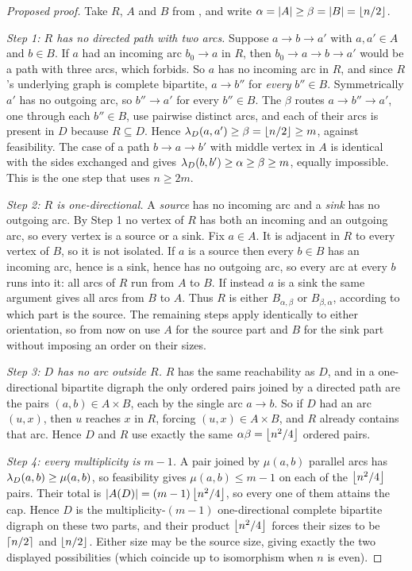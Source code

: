 \begin{proof}[Proposed proof]
Take $R$, $A$ and $B$ from , and write $\alpha = |A| \ge \beta = |B| = \left\lfloor n/2 \right\rfloor$.

\emph{Step 1: $R$ has no directed path with two arcs.} Suppose $a \to b \to a'$ with $a, a' \in A$ and $b \in B$. If $a$ had an incoming arc $b_0 \to a$ in $R$, then $b_0 \to a \to b \to a'$ would be a path with three arcs, which  forbids. So $a$ has no incoming arc in $R$, and since $R$'s underlying graph is complete bipartite, $a \to b''$ for \emph{every} $b'' \in B$. Symmetrically $a'$ has no outgoing arc, so $b'' \to a'$ for every $b'' \in B$. The $\beta$ routes $a \to b'' \to a'$, one through each $b'' \in B$, use pairwise distinct arcs, and each of their arcs is present in $D$ because $R \subseteq D$. Hence $\lambda_D(a,a') \ge \beta = \left\lfloor n/2 \right\rfloor \ge m$, against feasibility. The case of a path $b \to a \to b'$ with middle vertex in $A$ is identical with the sides exchanged and gives $\lambda_D(b,b') \ge \alpha \ge \beta \ge m$, equally impossible. This is the one step that uses $n \ge 2m$.

\emph{Step 2: $R$ is one-directional.} A \emph{source} has no incoming arc and a \emph{sink} has no outgoing arc. By Step 1 no vertex of $R$ has both an incoming and an outgoing arc, so every vertex is a source or a sink. Fix $a \in A$. It is adjacent in $R$ to every vertex of $B$, so it is not isolated. If $a$ is a source then every $b \in B$ has an incoming arc, hence is a sink, hence has no outgoing arc, so every arc at every $b$ runs into it: all arcs of $R$ run from $A$ to $B$. If instead $a$ is a sink the same argument gives all arcs from $B$ to $A$. Thus $R$ is either $B_{\alpha,\beta}$ or $B_{\beta,\alpha}$, according to which part is the source. The remaining steps apply identically to either orientation, so from now on use $A$ for the source part and $B$ for the sink part without imposing an order on their sizes.

\emph{Step 3: $D$ has no arc outside $R$.} $R$ has the same reachability as $D$, and in a one-directional bipartite digraph the only ordered pairs joined by a directed path are the pairs $(a,b) \in A \times B$, each by the single arc $a \to b$. So if $D$ had an arc $(u,x)$, then $u$ reaches $x$ in $R$, forcing $(u,x) \in A \times B$, and $R$ already contains that arc. Hence $D$ and $R$ use exactly the same $\alpha\beta = \left\lfloor n^2/4 \right\rfloor$ ordered pairs.

\emph{Step 4: every multiplicity is $m-1$.} A pair joined by $\mu(a,b)$ parallel arcs has $\lambda_D(a,b) \ge \mu(a,b)$, so feasibility gives $\mu(a,b) \le m-1$ on each of the $\left\lfloor n^2/4 \right\rfloor$ pairs. Their total is $|A(D)| = (m-1)\left\lfloor n^2/4 \right\rfloor$, so every one of them attains the cap. Hence $D$ is the multiplicity-$(m-1)$ one-directional complete bipartite digraph on these two parts, and their product $\left\lfloor n^2/4 \right\rfloor$ forces their sizes to be $\left\lceil n/2 \right\rceil$ and $\left\lfloor n/2 \right\rfloor$. Either size may be the source size, giving exactly the two displayed possibilities (which coincide up to isomorphism when $n$ is even).
\end{proof}

